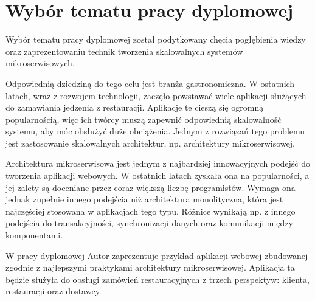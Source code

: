 \clearpage %
\section{Wybór tematu pracy dyplomowej}

Wybór tematu pracy dyplomowej został podytkowany chęcia pogłębienia wiedzy oraz zaprezentowaniu technik tworzenia skalowalnych systemów mikroserwisowych.

Odpowiednią dziedziną do tego celu jest branża gastronomiczna. W ostatnich latach, wraz z rozwojem technologii, zaczęło powstawać wiele aplikacji służących do zamawiania jedzenia z restauracji. Aplikacje te cieszą się ogromną popularnością, więc ich twórcy muszą zapewnić odpowiednią skalowalność systemu, aby móc obsłużyć duże obciążenia. Jednym z rozwiązań tego problemu jest zastosowanie skalowalnych architektur, np. architektury mikroserwisowej.

Architektura mikroserwisowa jest jednym z najbardziej innowacyjnych podejść do tworzenia aplikacji webowych. W ostatnich latach zyskała ona na popularności, a jej zalety są doceniane przez coraz większą liczbę programistów. Wymaga ona jednak zupełnie innego podejścia niż architektura monolityczna, która jest najczęściej stosowana w aplikacjach tego typu. Różnice wynikają np. z innego podejścia do transakcyjności, synchronizacji danych oraz komunikacji między komponentami.

W pracy dyplomowej Autor zaprezentuje przykład aplikacji webowej zbudowanej zgodnie z najlepszymi praktykami architektury mikroserwisowej. Aplikacja ta będzie służyła do obsługi zamówień restauracyjnych z trzech perspektyw: klienta, restauracji oraz dostawcy.